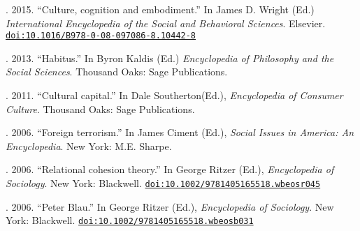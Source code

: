 
. 2015. ``Culture, cognition and embodiment.'' In James D. Wright (Ed.) {\em International Encyclopedia of the Social and Behavioral Sciences}. Elsevier. \href{https://doi.org/10.1016/B978-0-08-097086-8.10442-8}{\nolinkurl{doi:10.1016/B978-0-08-097086-8.10442-8}}

. 2013. ``Habitus.''  In Byron Kaldis (Ed.) {\em Encyclopedia of Philosophy and the Social Sciences}. Thousand Oaks: Sage Publications. 

. 2011. ``Cultural capital.''  In Dale Southerton(Ed.), {\em Encyclopedia of Consumer Culture}.  Thousand Oaks: Sage Publications. 

. 2006. ``Foreign terrorism.'' In James Ciment (Ed.), {\em Social Issues in America: An Encyclopedia}. New York: M.E. Sharpe. 

. 2006. ``Relational cohesion theory.'' In George Ritzer (Ed.), {\em Encyclopedia of Sociology}. New York: Blackwell. \href{https://doi.org/10.1002/9781405165518.wbeosr045}{\nolinkurl{doi:10.1002/9781405165518.wbeosr045}}

. 2006. ``Peter Blau.'' In George Ritzer (Ed.), {\em Encyclopedia of Sociology}. New York: Blackwell.  \href{https://doi.org/10.1002/9781405165518.wbeosb031}{\nolinkurl{doi:10.1002/9781405165518.wbeosb031}}
